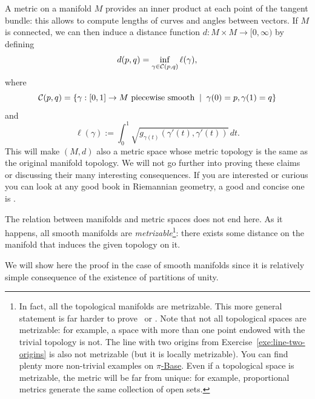 A metric on a manifold $M$ provides an inner product at each point of the tangent bundle: this allows to compute lengths of curves and angles between vectors. If $M$ is connected, we can then induce a distance function $d: M \times M \to [0, \infty)$ by defining
\begin{equation}
	d(p,q) = \inf_{\gamma \in \mathcal{C}(p,q)} \ell(\gamma),
\end{equation}
where
\begin{equation}
	\mathcal{C}(p,q) = \left\{\gamma : [0,1] \to M \mbox{ piecewise smooth} \;\mid\; \gamma(0)=p, \gamma(1)=q\right\}
\end{equation}
and
\begin{equation}
	\ell(\gamma) := \int_0^1 \sqrt{g_{\gamma(t)}(\gamma'(t), \gamma'(t))}\, dt.
\end{equation}
This will make $(M, d)$ also a metric space whose metric topology is the same as the original manifold topology.
We will not go further into proving these claims or discussing their many interesting consequences.
If you are interested or curious you can look at any good book in Riemannian geometry,
a good and concise one is \cite[Chapter 6]{book:lee:riemannian}.

The relation between manifolds and metric spaces does not end here. As it happens, all smooth manifolds are \emph{metrizable}\footnote{In fact, all the topological manifolds are metrizable. This more general statement is far harder to prove~\cite[Theorem 34.1 and Exercise 1 of Chapter 4.36]{book:munkres:topology} or \cite{nlab:urysohn_metrization_theorem}. Note that not all topological spaces are metrizable: for example, a space with more than one point endowed with the trivial topology is not. The line with two origins from Exercise~\ref{exe:line-two-origins} is also not metrizable (but it is locally metrizable). You can find plenty more non-trivial examples on \href{https://topology.pi-base.org/spaces?q=\%7EMetrizable}{$\pi$-Base}. Even if a topological space is metrizable, the metric will be far from unique: for example, proportional metrics generate the same collection of open sets.}: there exists some distance on the manifold that induces the given topology on it.

We will show here the proof in the case of smooth manifolds since it is relatively simple consequence of the existence of partitions of unity.

